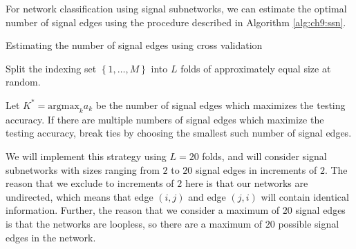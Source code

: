 For network classification using signal subnetworks, we can estimate the optimal number of signal edges using the procedure described in Algorithm \ref{alg:ch9:ssn}.

\begin{algorithm}
\label{alg:ch9:ssn}
\caption{Estimating the number of signal edges using cross validation}
\SetAlgoLined

Split the indexing set $\left\{1, \hdots, M\right\}$ into $L$ folds of approximately equal size at random.

Let $K^* = \text{argmax}_k a_k$ be the number of signal edges which maximizes the testing accuracy. If there are multiple numbers of signal edges which maximize the testing accuracy, break ties by choosing the smallest such number of signal edges.

\end{algorithm}

We will implement this strategy using $L = 20$ folds, and will consider signal subnetworks with sizes ranging from $2$ to $20$ signal edges in increments of $2$. The reason that we exclude to increments of $2$ here is that our networks are undirected, which means that edge $(i, j)$ and edge $(j, i)$ will contain identical information. Further, the reason that we consider a maximum of $20$ signal edges is that the networks are loopless, so there are a maximum of $20$ possible signal edges in the network.


